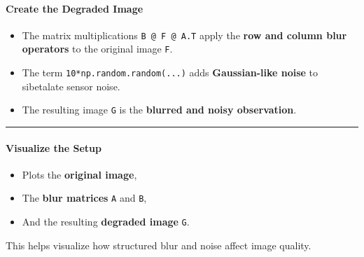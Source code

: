 \documentclass[11pt]{article}
\providecommand{\tightlist}{%
      \setlength{\itemsep}{0pt}\setlength{\parskip}{0pt}}
\begin{document}
\hypertarget{create-the-degraded-image}{%
\paragraph{\texorpdfstring{\textbf{Create the Degraded
Image}}{Create the Degraded Image}}\label{create-the-degraded-image}}

\begin{itemize}
\tightlist
\item
  The matrix multiplications \texttt{B\ @\ F\ @\ A.T} apply the
  \textbf{row and column blur operators} to the original image
  \texttt{F}.
\item
  The term \texttt{10*np.random.random(...)} adds \textbf{Gaussian-like
  noise} to sibetalate sensor noise.
\item
  The resulting image \texttt{G} is the \textbf{blurred and noisy
  observation}.
\end{itemize}

\begin{center}\rule{0.5\linewidth}{0.5pt}\end{center}

\hypertarget{visualize-the-setup}{%
\paragraph{\texorpdfstring{\textbf{Visualize the
Setup}}{Visualize the Setup}}\label{visualize-the-setup}}

\begin{itemize}
\tightlist
\item
  Plots the \textbf{original image},
\item
  The \textbf{blur matrices} \texttt{A} and \texttt{B},
\item
  And the resulting \textbf{degraded image} \texttt{G}.
\end{itemize}

This helps visualize how structured blur and noise affect image quality.
\end{document}
